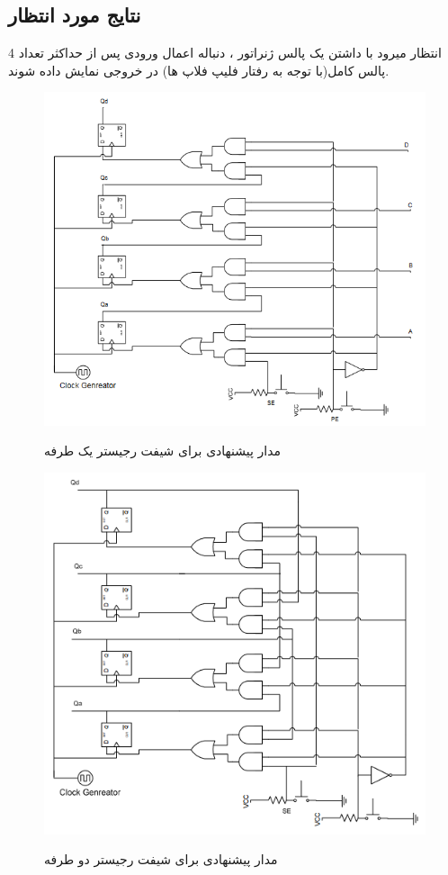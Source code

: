 \documentclass[twoside]{article}
\begin{document}
\begin{itemize}
	 \subsection*{نتایج مورد انتظار}
	 انتظار میرود با داشتن یک پالس ژنراتور ، دنباله اعمال ورودی پس از حداکثر تعداد 4 پالس کامل(با توجه به رفتار فلیپ فلاپ ها) در خروجی نمایش داده شوند.
		\begin{figure}[h!]
			\begin{center}
				\includegraphics[scale=0.5]{suggested_circuit}‎
				\caption{مدار پیشنهادی برای شیفت رجیستر یک طرفه}
			\end{center}
		\end{figure} 
	
		\begin{figure}[h!]
			\begin{center}
				\includegraphics[scale=0.5]{suggested_circuit_2}‎
				\caption{مدار پیشنهادی برای شیفت رجیستر دو طرفه}
			\end{center}
		\end{figure} 
	\end{itemize}
\end{document}
